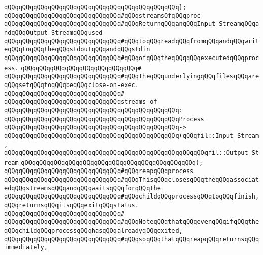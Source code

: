 \verb|qQQqqQQqqQQqqQQqqQQqqQQqqQQqqQQqqQQqqQQqqQQqqQQq};|\newline
\newline
\verb|qQQqqQQqqQQqqQQqqQQqqQQqqQQqqQQq#qQQqstreamsOfqQQqproc|\newline
\verb|qQQqqQQqqQQqqQQqqQQqqQQqqQQqqQQq#qQQqReturnqQQqanqQQqInput_StreamqQQqandqQQqOutput_StreamqQQqused|\newline
\verb|qQQqqQQqqQQqqQQqqQQqqQQqqQQqqQQq#qQQqtoqQQqreadqQQqfromqQQqandqQQqwriteqQQqtoqQQqtheqQQqstdoutqQQqandqQQqstdin|\newline
\verb|qQQqqQQqqQQqqQQqqQQqqQQqqQQqqQQq#qQQqofqQQqtheqQQqqQQqexecutedqQQqprocess.|\newline
\verb|qQQqqQQqqQQqqQQqqQQqqQQqqQQqqQQq#|\newline
\verb|qQQqqQQqqQQqqQQqqQQqqQQqqQQqqQQq#qQQqTheqQQqunderlyingqQQqfilesqQQqareqQQqsetqQQqtoqQQqbeqQQqclose-on-exec.|\newline
\verb|qQQqqQQqqQQqqQQqqQQqqQQqqQQqqQQq#|\newline
\verb|qQQqqQQqqQQqqQQqqQQqqQQqqQQqqQQqstreams_of|\newline
\verb|qQQqqQQqqQQqqQQqqQQqqQQqqQQqqQQqqQQqqQQqqQQqqQQq:|\newline
\verb|qQQqqQQqqQQqqQQqqQQqqQQqqQQqqQQqqQQqqQQqqQQqqQQqProcess|\newline
\verb|qQQqqQQqqQQqqQQqqQQqqQQqqQQqqQQqqQQqqQQqqQQqqQQq->|\newline
\verb|qQQqqQQqqQQqqQQqqQQqqQQqqQQqqQQqqQQqqQQqqQQqqQQq(qQQqfil::Input_Stream,|\newline
\verb|qQQqqQQqqQQqqQQqqQQqqQQqqQQqqQQqqQQqqQQqqQQqqQQqqQQqqQQqfil::Output_Stream|\newline
\verb|qQQqqQQqqQQqqQQqqQQqqQQqqQQqqQQqqQQqqQQqqQQqqQQq);|\newline
\newline
\verb|qQQqqQQqqQQqqQQqqQQqqQQqqQQqqQQq#qQQqreapqQQqprocess|\newline
\verb|qQQqqQQqqQQqqQQqqQQqqQQqqQQqqQQq#qQQqThisqQQqclosesqQQqtheqQQqassociatedqQQqstreamsqQQqandqQQqwaitsqQQqforqQQqthe|\newline
\verb|qQQqqQQqqQQqqQQqqQQqqQQqqQQqqQQq#qQQqchildqQQqprocessqQQqtoqQQqfinish,qQQqreturnsqQQqitsqQQqexitqQQqstatus.|\newline
\verb|qQQqqQQqqQQqqQQqqQQqqQQqqQQqqQQq#|\newline
\verb|qQQqqQQqqQQqqQQqqQQqqQQqqQQqqQQq#qQQqNoteqQQqthatqQQqevenqQQqifqQQqtheqQQqchildqQQqprocessqQQqhasqQQqalreadyqQQqexited,|\newline
\verb|qQQqqQQqqQQqqQQqqQQqqQQqqQQqqQQq#qQQqsoqQQqthatqQQqreapqQQqreturnsqQQqimmediately,|\newline
